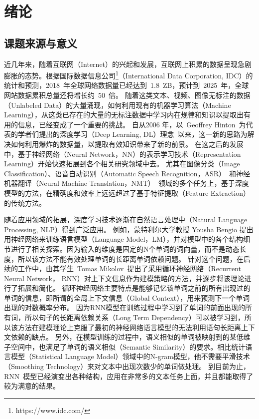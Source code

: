 \chapter{绪论}
\section{课题来源与意义}
近几年来，随着互联网（Internet）的兴起和发展，互联网上积累的数据呈现急剧膨胀的态势。根据国际数据信息公司\footnote{https://www.idc.com/}（International Data Corporation, IDC）的统计和预测，2018~年全球网络数据量已经达到~1.8~ZB，预计到~2025~年，全球网站数据累积总量还将增长约~50~倍。
随着这类文本、视频、图像无标注的数据（Unlabeled Data）的大量涌现，如何利用现有的机器学习算法（Machine Learning），从这类已存在的大量的无标注数据中学习内在规律和知识以提取出有用的信息，已经变成了一个重要的挑战。
自从2006 年，以~Geoffrey Hinton~为代表的学者们提出的深度学习（Deep Learning, DL）理念~以来，这一新的思路为解决如何利用爆炸的数据量，以提取有效知识带来了新的前景。
在这之后的发展中，基于神经网络（Neural Network，NN）的表示学习技术（Representation Learning）开始快速拓展到各个相关研究领域中去。
尤其在图像分类（Image Classification）、语音自动识别（Automatic Speech Recognition，ASR）~和神经机器翻译（Neural Machine Translation，NMT）~领域的多个任务上，基于深度模型的方法，在精确度和效率上远远超过了基于特征提取（Feature Extraction）的传统方法。

随着应用领域的拓展，深度学习技术逐渐在自然语言处理中（Natural Language Processing, NLP）得到广泛应用。 例如，蒙特利尔大学教授 Yousha Bengio 提出用神经网络来训练语言模型（Language Model，LM），并对模型中的各个结构细节进行了相关探索。因为输入的维度是固定的N个单词的词向量，而不是动态长度，所以该方法不能有效处理单词的长距离单词依赖问题。
针对这个问题，在后续的工作中，由其学生~Tomas Mikolov~提出了采用循环神经网络（Recurrent Neural Network， RNN）对上下文信息作为建模策略的方法，并逐步将该理论进行了拓展和简化。
循环神经网络主要特点是能够记忆该单词之前的所有出现过的单词的信息，即所谓的全局上下文信息（Global Context），用来预测下一个单词出现的对数概率分布。
因为RNN模型在训练过程中学习到了单词的前面出现的所有词，所以句子的长距离依赖关系（Long Term Dependency）可以被学习到，所以该方法在建模理论上克服了最初的神经网络语言模型的无法利用语句长距离上下文依赖的缺点。
另外，在模型训练的过程中，语义相似的单词被映射到的某低维子空间中，也满足了单词的语义相似（Semantic Similarity）的要求。相比统计语言模型（Statistical Language Model）领域中的N-gram模型，他不需要平滑技术（Smoothing Technology）来对文本中出现次数少的单词做处理。
到目前为止，RNN~模型已经演变出各种结构，应用在非常多的文本任务上面，并且都能取得了较为满意的结果。

